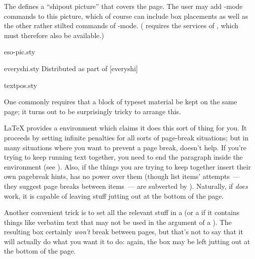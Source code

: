 The  defines a ``shipout picture'' that covers the
page.  The user may add -mode commands to this
picture, which of course can include box placements as well as the
other rather stilted commands of -mode.
( requires the services of , which
must therefore also be available.)
%
\begin{ctanrefs}
\item[eso-pic.sty]
\item[everyshi.sty]Distributed as part of [everyshi]
\item[textpos.sty]
\end{ctanrefs}


One commonly requires that a block of typeset material be kept on the
same page; it turns out to be surprisingly tricky to arrange this.

\LaTeX{} provides a  environment which claims it
does this sort of thing for you.  It proceeds by setting infinite
penalties for all sorts of page-break situations; but in many
situations where you want to prevent a page break,
 doesn't help.  If you're trying to keep running
text together, you need to end the paragraph inside the environment
(see ).
Also, if the things you are trying to keep together insert their own
pagebreak hints,  has no power over them (though
list items' attempts~--- they suggest page breaks between items~---
are subverted by ).  Naturally, if
 \emph{does} work, it is capable of leaving
stuff jutting out at the bottom of the page.

Another convenient trick is to set all the relevant stuff in a
 (or a  if it contains things like
verbatim text that may not be used in the argument of a ).
The resulting box certainly \emph{won't} break between pages, but
that's not to say that it will actually do what you want it to do:
again, the box may be left jutting out at the bottom of the page.

